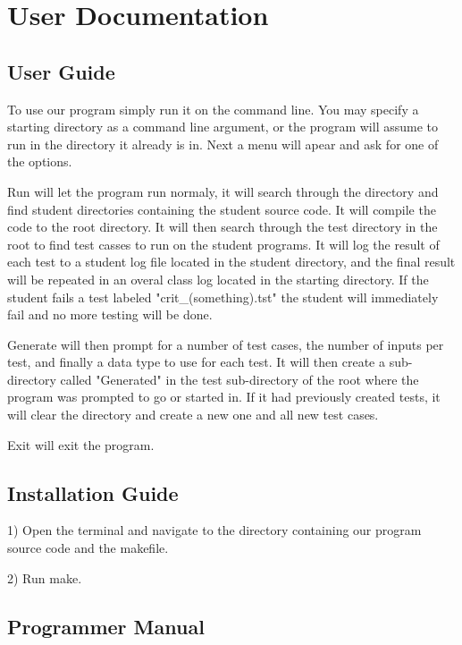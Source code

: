 
\chapter{User Documentation}



\section{User Guide}

To use our program simply run it on the command line. You may specify a starting directory as a command
line argument, or the program will assume to run in the directory it already is in. Next a menu will apear
and ask for one of the options. 

Run will let the program run normaly, it will search through the directory
and find student directories containing the student source code. It will compile the code to the
root directory. It will then search through the test directory in the root to find test casses to run on the
student programs. It will log the result of each test to a student log file located in the student directory, and
the final result will be repeated in an overal class log located in the starting directory. If the student
fails a test labeled "crit\_(something).tst" the student will immediately fail and no more testing will be done.

Generate will then prompt for a number of test cases, the number of inputs per test, and finally a data type
to use for each test. It will then create a sub-directory called "Generated" in the test sub-directory of the root
where the program was prompted to go or started in. If it had previously created tests, it will clear the directory
and create a new one and all new test cases.

Exit will exit the program.


\section{Installation Guide}

1) Open the terminal and navigate to the directory containing our program source code and the makefile.

2) Run make.


\section{Programmer Manual}

